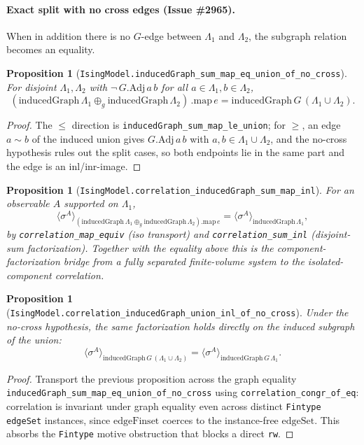 \documentclass[a4paper,11pt]{article}
\newtheorem{proposition}[theorem]{Proposition}
\begin{document}
\paragraph{Exact split with no cross edges (Issue \#2965).}
When in addition there is no $G$-edge between $\Lambda_1$ and $\Lambda_2$, the
subgraph relation becomes an equality.

\begin{proposition}[\texttt{IsingModel.inducedGraph\_sum\_map\_eq\_union\_of\_no\_cross}]
For disjoint $\Lambda_1,\Lambda_2$ with $\neg\,G.\mathrm{Adj}\,a\,b$ for all
$a\in\Lambda_1,b\in\Lambda_2$,
\[
  (\mathrm{inducedGraph}\,\Lambda_1\oplus_g\mathrm{inducedGraph}\,\Lambda_2)
    \,.\mathrm{map}\,e
  = \mathrm{inducedGraph}\,G\,(\Lambda_1\cup\Lambda_2).
\]
\end{proposition}

\begin{proof}
The $\le$ direction is \texttt{inducedGraph\_sum\_map\_le\_union}; for $\ge$, an
edge $a\sim b$ of the induced union gives $G.\mathrm{Adj}\,a\,b$ with
$a,b\in\Lambda_1\cup\Lambda_2$, and the no-cross hypothesis rules out the split
cases, so both endpoints lie in the same part and the edge is an
$\mathrm{inl}$/$\mathrm{inr}$-image.
\end{proof}

\begin{proposition}[\texttt{IsingModel.correlation\_inducedGraph\_sum\_map\_inl}]
For an observable $A$ supported on $\Lambda_1$,
\[
  \langle\sigma^{A}\rangle_{(\mathrm{inducedGraph}\,\Lambda_1
    \oplus_g\mathrm{inducedGraph}\,\Lambda_2).\mathrm{map}\,e}
  = \langle\sigma^{A}\rangle_{\mathrm{inducedGraph}\,\Lambda_1},
\]
by \texttt{correlation\_map\_equiv} (iso transport) and
\texttt{correlation\_sum\_inl} (disjoint-sum factorization). Together with the
equality above this is the component-factorization bridge from a fully separated
finite-volume system to the isolated-component correlation.
\end{proposition}

\begin{proposition}[\texttt{IsingModel.correlation\_inducedGraph\_union\_inl\_of\_no\_cross}]
Under the no-cross hypothesis, the same factorization holds directly on the
induced subgraph of the union:
\[
  \langle\sigma^{A}\rangle_{\mathrm{inducedGraph}\,G\,(\Lambda_1\cup\Lambda_2)}
  = \langle\sigma^{A}\rangle_{\mathrm{inducedGraph}\,G\,\Lambda_1}.
\]
\end{proposition}

\begin{proof}
Transport the previous proposition across the graph equality
\texttt{inducedGraph\_sum\_map\_eq\_union\_of\_no\_cross} using
\texttt{correlation\_congr\_of\_eq}: correlation is invariant under graph
equality even across distinct \texttt{Fintype edgeSet} instances, since
$\mathrm{edgeFinset}$ coerces to the instance-free $\mathrm{edgeSet}$. This
absorbs the \texttt{Fintype} motive obstruction that blocks a direct
\texttt{rw}.
\end{proof}
\end{document}
